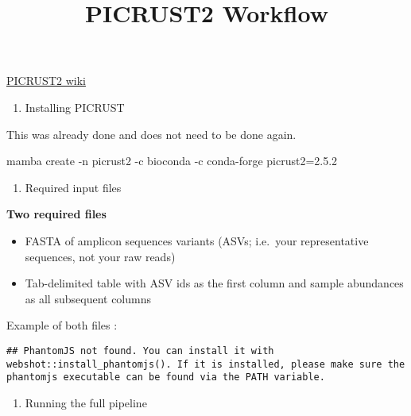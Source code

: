 \documentclass[
]{book}
\title{PICRUST2 Workflow}
\author{}
\date{\vspace{-2.5em}}
\newenvironment{Shaded}{\begin{snugshade}}{\end{snugshade}}
\newcommand{\AttributeTok}[1]{\textcolor[rgb]{0.13,0.29,0.53}{#1}}
\newcommand{\ExtensionTok}[1]{#1}
\newcommand{\NormalTok}[1]{#1}
\providecommand{\tightlist}{%
  \setlength{\itemsep}{0pt}\setlength{\parskip}{0pt}}
\begin{document}
\maketitle

{
\setcounter{tocdepth}{1}
\tableofcontents
}
\href{https://github.com/picrust/picrust2/wiki}{PICRUST2 wiki}

\begin{enumerate}
\def\labelenumi{\arabic{enumi}.}
\tightlist
\item
  Installing PICRUST
\end{enumerate}

This was already done and does not need to be done again.

\begin{Shaded}
\begin{Highlighting}[]
\ExtensionTok{mamba}\NormalTok{ create }\AttributeTok{{-}n}\NormalTok{ picrust2 }\AttributeTok{{-}c}\NormalTok{ bioconda }\AttributeTok{{-}c}\NormalTok{ conda{-}forge picrust2=2.5.2}
\end{Highlighting}
\end{Shaded}

\begin{enumerate}
\def\labelenumi{\arabic{enumi}.}
\setcounter{enumi}{1}
\tightlist
\item
  Required input files
\end{enumerate}

\textbf{Two required files}

\begin{itemize}
\tightlist
\item
  FASTA of amplicon sequences variants (ASVs; i.e.~your representative sequences, not your raw reads)
\item
  Tab-delimited table with ASV ids as the first column and sample abundances as all subsequent columns
\end{itemize}

Example of both files :

\begin{verbatim}
## PhantomJS not found. You can install it with webshot::install_phantomjs(). If it is installed, please make sure the phantomjs executable can be found via the PATH variable.
\end{verbatim}

\begin{enumerate}
\def\labelenumi{\arabic{enumi}.}
\setcounter{enumi}{2}
\tightlist
\item
  Running the full pipeline
\end{enumerate}
\end{document}
